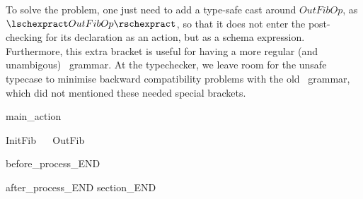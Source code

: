 To solve the problem, one just need to add a type-safe cast around $OutFibOp$,
as $\lschexpract OutFibOp \rschexpract$, so that it does not enter the post-checking 
for its declaration as an action, but as a schema expression. Furthermore, this extra
bracket is useful for having a more regular (and unambigous) \Circus\ grammar. 
At the typechecker, we leave room for the unsafe typecase to minimise backward compatibility 
problems with the old \Circus\ grammar, which did not mentioned these needed special brackets.

main_action
\begin{circusaction}
    \circspot InitFib ~\circseq~ OutFib
\end{circusaction}
before_process_END
\begin{circus}
    \circend
\end{circus}
after_process_END
section_END 
